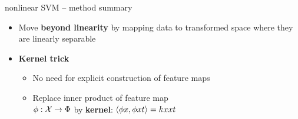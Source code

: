 \begin{frame}{nonlinear SVM -- method summary}
   

  
\begin{itemize}
\item Move \textbf{beyond linearity} by mapping data to 
transformed space where they are linearly separable
\item \textbf{Kernel trick} %
\begin{itemize}
  \item No need for explicit construction of feature maps
  \item Replace inner product of feature map \\$\phi: \mathcal{X} \to \Phi$ by \textbf{kernel}: $\left\langle \phi x, \phi xt \right\rangle = kxxt$
\end{itemize}
\end{itemize}

\medskip



\end{frame}
